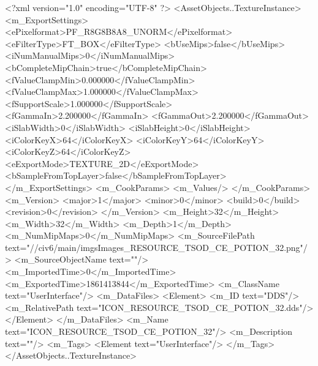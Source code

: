 <?xml version="1.0" encoding="UTF-8" ?>
<AssetObjects..TextureInstance>
	<m_ExportSettings>
		<ePixelformat>PF_R8G8B8A8_UNORM</ePixelformat>
		<eFilterType>FT_BOX</eFilterType>
		<bUseMips>false</bUseMips>
		<iNumManualMips>0</iNumManualMips>
		<bCompleteMipChain>true</bCompleteMipChain>
		<fValueClampMin>0.000000</fValueClampMin>
		<fValueClampMax>1.000000</fValueClampMax>
		<fSupportScale>1.000000</fSupportScale>
		<fGammaIn>2.200000</fGammaIn>
		<fGammaOut>2.200000</fGammaOut>
		<iSlabWidth>0</iSlabWidth>
		<iSlabHeight>0</iSlabHeight>
		<iColorKeyX>64</iColorKeyX>
		<iColorKeyY>64</iColorKeyY>
		<iColorKeyZ>64</iColorKeyZ>
		<eExportMode>TEXTURE_2D</eExportMode>
		<bSampleFromTopLayer>false</bSampleFromTopLayer>
	</m_ExportSettings>
	<m_CookParams>
		<m_Values/>
	</m_CookParams>
	<m_Version>
		<major>1</major>
		<minor>0</minor>
		<build>0</build>
		<revision>0</revision>
	</m_Version>
	<m_Height>32</m_Height>
	<m_Width>32</m_Width>
	<m_Depth>1</m_Depth>
	<m_NumMipMaps>0</m_NumMipMaps>
	<m_SourceFilePath text="//civ6/main/imgs\Processed Images\ICON_RESOURCE_TSOD_CE_POTION_32.png"/>
	<m_SourceObjectName text=""/>
	<m_ImportedTime>0</m_ImportedTime>
	<m_ExportedTime>1861413844</m_ExportedTime>
	<m_ClassName text="UserInterface"/>
	<m_DataFiles>
		<Element>
			<m_ID text="DDS"/>
			<m_RelativePath text="ICON_RESOURCE_TSOD_CE_POTION_32.dds"/>
		</Element>
	</m_DataFiles>
	<m_Name text="ICON_RESOURCE_TSOD_CE_POTION_32"/>
	<m_Description text=""/>
	<m_Tags>
		<Element text="UserInterface"/>
	</m_Tags>
</AssetObjects..TextureInstance>

